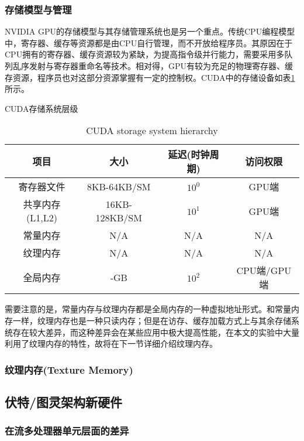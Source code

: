 \subsubsection{存储模型与管理} 
\par NVIDIA GPU的存储模型与其存储管理系统也是另一个重点。传统CPU编程模型中，寄存器、缓存等资源都是由CPU自行管理，而不开放给程序员。其原因在于CPU拥有的寄存器、缓存资源较为紧缺，为提高指令级并行能力，需要采用多队列乱序发射与寄存器重命名等技术。相对得，GPU有较为充足的物理寄存器、缓存资源，程序员也对这部分资源掌握有一定的控制权\parencite{CUDAPROG}。CUDA中的存储设备如表\ref{table-存储}所示。
\begin{table}
	\centering
	\renewcommand{\thetable}{\arabic{section}-\arabic{table} }
	\renewcommand{\tablename}{表}
	\caption{CUDA存储系统层级}
	\addtocounter{table}{-1}
	\renewcommand{\thetable}{\arabic{section}-\arabic{table} }
	\renewcommand{\tablename}{Table}
	\caption{CUDA storage system hierarchy}
	\begin{tabular}{cccc}
		\toprule
		项目				&	大小			&	延迟(时钟周期)	&	访问权限	\\
		\midrule
		寄存器文件		&	8KB-64KB/SM		&	$ 10^0 $	& GPU端	\\
		共享内存(L1,L2)	&	16KB-128KB/SM	&	$ 10^1 $	&	GPU端\\
		常量内存		&	N/A				&	N/A		&	N/A	\\
		纹理内存		&	N/A				&	N/A		&	N/A \\
		全局内存		&	-GB				&	$ 10^2 $	&	CPU端/GPU端 \\
		\bottomrule
	\end{tabular} \label{table-存储}
\end{table}
\par 需要注意的是，常量内存与纹理内存都是全局内存的一种虚拟地址形式。和常量内存一样，纹理内存也是一种只读内存；但是在访存、缓存加载方式上与其余存储系统存在较大差异，而这种差异会在某些应用中极大提高性能，在本文的实验中大量利用了纹理内存的特性，故将在下一节详细介绍纹理内存。
\subsubsection{纹理内存(Texture Memory)}
\par 
\subsection{伏特/图灵架构新硬件}     
\subsubsection{在流多处理器单元层面的差异}
